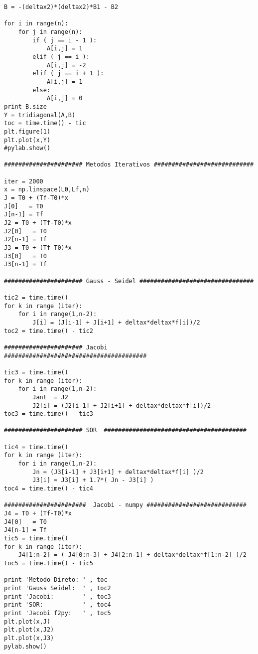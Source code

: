 \begin{lstlisting}
B = -(deltax2)*(deltax2)*B1 - B2

for i in range(n):
    for j in range(n):
        if ( j == i - 1 ):
            A[i,j] = 1
        elif ( j == i ):
            A[i,j] = -2
        elif ( j == i + 1 ):
            A[i,j] = 1
        else:
            A[i,j] = 0
print B.size
Y = tridiagonal(A,B)
toc = time.time() - tic
plt.figure(1)
plt.plot(x,Y)
#pylab.show()

###################### Metodos Iterativos ############################

iter = 2000
x = np.linspace(L0,Lf,n)
J = T0 + (Tf-T0)*x
J[0]   = T0
J[n-1] = Tf
J2 = T0 + (Tf-T0)*x
J2[0]   = T0
J2[n-1] = Tf
J3 = T0 + (Tf-T0)*x
J3[0]   = T0
J3[n-1] = Tf

###################### Gauss - Seidel ################################

tic2 = time.time()
for k in range (iter):
    for i in range(1,n-2):
        J[i] = (J[i-1] + J[i+1] + deltax*deltax*f[i])/2
toc2 = time.time() - tic2

###################### Jacobi  ########################################

tic3 = time.time()
for k in range (iter):
    for i in range(1,n-2):
        Jant  = J2
        J2[i] = (J2[i-1] + J2[i+1] + deltax*deltax*f[i])/2
toc3 = time.time() - tic3

###################### SOR  ########################################

tic4 = time.time()
for k in range (iter):
    for i in range(1,n-2):
        Jn = (J3[i-1] + J3[i+1] + deltax*deltax*f[i] )/2   
        J3[i] = J3[i] + 1.7*( Jn - J3[i] )
toc4 = time.time() - tic4

#######################  Jacobi - numpy ############################
J4 = T0 + (Tf-T0)*x
J4[0]   = T0
J4[n-1] = Tf
tic5 = time.time()
for k in range (iter):
    J4[1:n-2] = ( J4[0:n-3] + J4[2:n-1] + deltax*deltax*f[1:n-2] )/2
toc5 = time.time() - tic5

print 'Metodo Direto: ' , toc
print 'Gauss Seidel:  ' , toc2
print 'Jacobi:        ' , toc3
print 'SOR:           ' , toc4
print 'Jacobi f2py:   ' , toc5
plt.plot(x,J)
plt.plot(x,J2)
plt.plot(x,J3)
pylab.show()
\end{lstlisting}